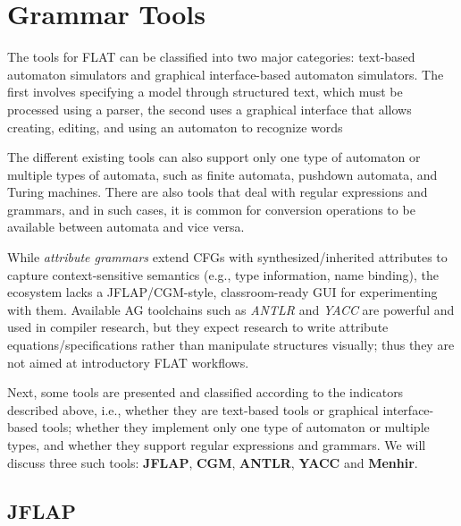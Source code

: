 
%


\chapter{Grammar Tools}
\label{cha:grammar_tools}

The tools for FLAT can be classified into two major categories:
text-based automaton simulators and graphical interface-based automaton simulators. 
The first involves specifying a model through structured text, which must be processed using a parser, the second uses a graphical 
interface that allows creating, editing, and using an automaton to recognize words

The different existing tools can also support only one type of automaton or multiple types of automata, 
such as finite automata, pushdown automata, and Turing machines.
There are also tools that deal with regular expressions and grammars, and in such cases, it is 
common for conversion operations to be available between automata and vice versa.

While \emph{attribute grammars} extend CFGs with synthesized/inherited attributes to capture context-sensitive semantics 
(e.g., type information, name binding), the ecosystem lacks a JFLAP/CGM-style, classroom-ready GUI for experimenting with them. 
Available AG toolchains such as \textit{ANTLR} and \textit{YACC} are powerful and used in compiler research, but they expect 
research to write attribute equations/specifications rather than manipulate structures visually; thus they are not aimed at introductory FLAT workflows. 

Next, some tools are presented and classified according to the indicators described above, i.e., 
whether they are text-based tools or graphical interface-based tools; whether they implement only one type of 
automaton or multiple types, and whether they support regular expressions and grammars.
We will discuss three such tools: \textbf{JFLAP}, \textbf{CGM}, \textbf{ANTLR}, \textbf{YACC} and \textbf{Menhir}.

\section{JFLAP} 

